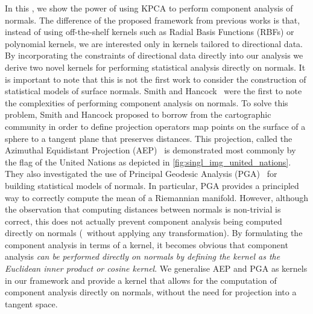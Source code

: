 In this , we show the power of using KPCA to perform
component analysis of normals. The difference of the proposed framework from
previous works is that, instead of using off-the-shelf kernels such as Radial
Basis Functions (RBFs) or polynomial kernels, we are interested only in kernels
tailored to directional data. By incorporating the constraints of directional
data directly into our analysis we derive two novel kernels for performing
statistical analysis directly on normals. It is important to note that this is
not the first work to consider the construction of statistical models of surface
normals. Smith and Hancock~\cite{smith2006recovering,smith2008facial} were the
first to note the complexities of performing component analysis on normals. To
solve this problem, Smith and Hancock proposed to borrow from the cartographic
community in order to define projection operators map points on the surface of a
sphere to a tangent plane that preserves distances. This projection, called the
Azimuthal Equidistant Projection (AEP)~\cite{snyder1987map} is demonstrated most
commonly by the flag of the United Nations as depicted in
\cref{fig:singl_img_united_nations}. They also investigated the use of Principal
Geodesic Analysis (PGA)~\cite{fletcher2004principal,smith2008facial} for
building statistical models of normals. In particular, PGA provides a principled
way to correctly compute the mean of a Riemannian manifold. However, although
the observation that computing distances between normals is non-trivial is
correct, this does not actually prevent component analysis being computed
directly on normals (\ie~without applying any transformation). By formulating
the component analysis in terms of a kernel, it becomes obvious that component
analysis \textit{can be performed directly on normals by defining the kernel as
the Euclidean inner product or cosine kernel}. We generalise AEP and PGA as
kernels in our framework and provide a kernel that allows for the computation of
component analysis directly on normals, without the need for projection into a
tangent space.


